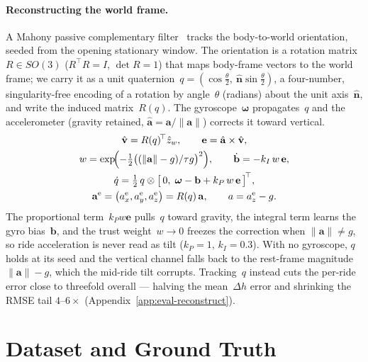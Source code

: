 \documentclass[manuscript,review,screen]{acmart}
\begin{document}
\paragraph{Reconstructing the world frame.}
A Mahony passive complementary filter~\cite{mahony2008} tracks the
body-to-world orientation, seeded from the opening stationary window.
The orientation is a rotation matrix~$R\in SO(3)$ ($R^{\!\top}R=I$,
$\det R=1$) that maps body-frame vectors to the world frame; we carry it
as a unit quaternion~$q=(\cos\tfrac\theta2,\ \hat{\mathbf n}\sin\tfrac
\theta2)$, a four-number, singularity-free encoding of a rotation by
angle~$\theta$ (radians) about the unit axis~$\hat{\mathbf n}$, and write
the induced matrix~$R(q)$.  The gyroscope~$\boldsymbol\omega$
propagates~$q$ and the accelerometer (gravity retained,
$\hat{\mathbf a}=\mathbf a/\lVert\mathbf a\rVert$) corrects it toward
vertical.
\begin{gather}
  \hat{\mathbf v}=R(q)^{\!\top}\hat z_w,\qquad
  \mathbf e=\hat{\mathbf a}\times\hat{\mathbf v},
  \label{eq:mahony-err}\\
  w=\exp\!\Bigl(-\tfrac12\bigl((\lVert\mathbf a\rVert-g)/\tau g\bigr)^{2}\Bigr),
  \qquad
  \dot{\mathbf b}=-k_I\,w\,\mathbf e,
  \label{eq:mahony-gate}\\
  \dot q=\tfrac12\,q\otimes
         \bigl[\,0,\;\boldsymbol\omega-\mathbf b+k_P\,w\,\mathbf e\,\bigr]^{\!\top},
  \label{eq:mahony}\\
  \mathbf a^{\mathrm e}=\bigl(a^{\mathrm e}_x,a^{\mathrm e}_y,a^{\mathrm e}_z\bigr)
    =R(q)\,\mathbf a,\qquad a=a^{\mathrm e}_z-g .
  \label{eq:world-accel}
\end{gather}
The proportional term~$k_P w\mathbf e$ pulls~$q$ toward gravity, the
integral term learns the gyro bias~$\mathbf b$, and the trust
weight~$w\!\to\!0$ freezes the correction when
$\lVert\mathbf a\rVert\!\neq\!g$, so ride acceleration is never read as
tilt ($k_P\!=\!1,\,k_I\!=\!0.3$).  With no gyroscope, $q$ holds at its
seed and the vertical channel falls back to the rest-frame
magnitude~$\lVert\mathbf a\rVert-g$, which the mid-ride tilt corrupts.
Tracking~$q$ instead cuts the per-ride error close to threefold overall
--- halving the mean~$\Delta h$ error and shrinking the RMSE tail
$4$--$6\times$ (Appendix~\ref{app:eval-reconstruct}).

\section{Dataset and Ground Truth}
\label{sec:dataset}
\end{document}
